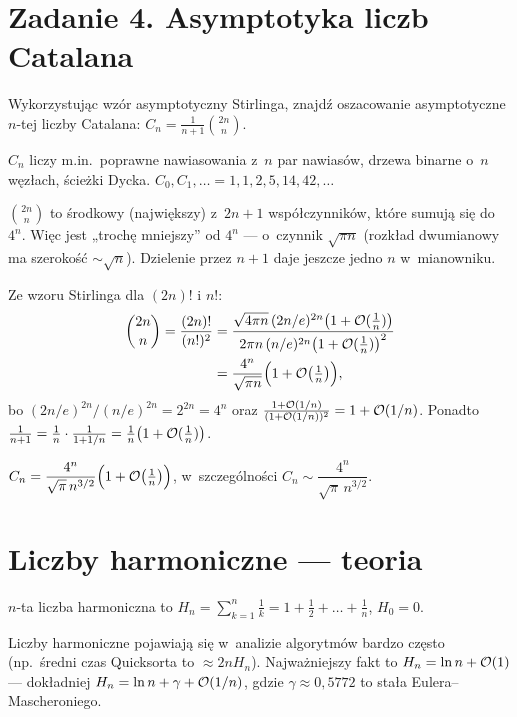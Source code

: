 \documentclass[11pt]{article}
\begin{document}
\section{Zadanie 4. Asymptotyka liczb Catalana}
\begin{tresc}
Wykorzystując wzór asymptotyczny Stirlinga, znajdź oszacowanie asymptotyczne
$n$-tej liczby Catalana: $C_n = \frac{1}{n+1}\binom{2n}{n}$.
\end{tresc}

\begin{teoria}
$C_n$ liczy m.in.\ poprawne nawiasowania z~$n$ par nawiasów, drzewa binarne
o~$n$ węzłach, ścieżki Dycka. $C_0,C_1,\ldots = 1,1,2,5,14,42,\ldots$
\end{teoria}

\begin{intuicja}
$\binom{2n}{n}$ to środkowy (największy) z~$2n+1$ współczynników, które
sumują się do $4^n$. Więc jest „trochę mniejszy” od $4^n$ --- o~czynnik
$\sqrt{\pi n}$ (rozkład dwumianowy ma szerokość $\sim\sqrt n$). Dzielenie przez
$n+1$ daje jeszcze jedno $n$ w~mianowniku.
\end{intuicja}
\formalnie
Ze wzoru Stirlinga dla $(2n)!$ i $n!$:
\begin{align*}
\binom{2n}{n} = \frac{(2n)!}{(n!)^2}
&= \frac{\sqrt{4\pi n}\,(2n/e)^{2n}\bigl(1+\mathcal{O}(\frac1n)\bigr)}{2\pi n\,(n/e)^{2n}\bigl(1+\mathcal{O}(\frac1n)\bigr)^2}\\
&= \frac{4^n}{\sqrt{\pi n}}\Bigl(1+\mathcal{O}\bigl(\tfrac1n\bigr)\Bigr),
\end{align*}
bo $(2n/e)^{2n}/(n/e)^{2n} = 2^{2n} = 4^n$ oraz $\frac{1+\mathcal{O}(1/n)}{(1+\mathcal{O}(1/n))^2} = 1+\mathcal{O}(1/n)$.
Ponadto $\frac{1}{n+1} = \frac1n\cdot\frac{1}{1+1/n} = \frac1n\bigl(1+\mathcal{O}(\frac1n)\bigr)$.
\begin{odpowiedz}
$C_n = \dfrac{4^n}{\sqrt{\pi}\, n^{3/2}}\Bigl(1+\mathcal{O}\bigl(\tfrac1n\bigr)\Bigr)$, \quad w~szczególności $C_n\sim \dfrac{4^n}{\sqrt\pi\,n^{3/2}}$.
\end{odpowiedz}

\section{Liczby harmoniczne --- teoria}
\begin{definicja}
$n$-ta liczba harmoniczna to $H_n = \sum_{k=1}^n \frac1k = 1+\frac12+\dots+\frac1n$, $H_0=0$.
\end{definicja}
Liczby harmoniczne pojawiają się w~analizie algorytmów bardzo często (np.\
średni czas Quicksorta to $\approx 2nH_n$). Najważniejszy fakt to
$H_n = \ln n + \mathcal{O}(1)$ --- dokładniej $H_n = \ln n + \gamma + \mathcal{O}(1/n)$, gdzie
$\gamma\approx 0{,}5772$ to stała Eulera--Mascheroniego.
\end{document}
